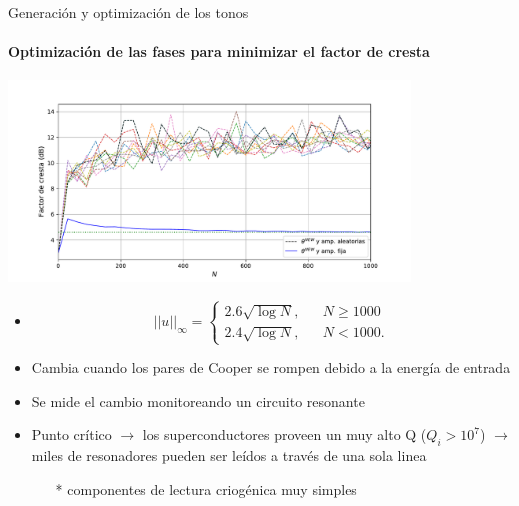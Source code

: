 \documentclass[ignorenonframetext,12pt]{beamer}
\begin{document}
\begin{frame}{Generación y optimización de los tonos}
	\framesubtitle{Optimización de las fases para minimizar el factor de cresta}
	\centering
	\qquad \includegraphics[width=0.8\textwidth]{c3_fc_newman_amp_fases_aleatorias_tot}
	\begin{itemize}
		\item 
			\begin{equation}\label{eq_fc_aleatorios}
  ||u||_\infty = \left\{\begin{array}{rcl}
    2.6 \sqrt{\log{N}}, && N \geq 1000\\
    2.4 \sqrt{\log{N}}, && N < 1000.
  \end{array}\right.
\end{equation}

		\item Cambia cuando los pares de Cooper se rompen debido a la
			energía de entrada
		\item Se mide el cambio monitoreando un circuito resonante
		\item Punto crítico $\to$ los \alert{superconductores proveen un muy
			alto Q} ($Q_i > 10^7$) $\to$ miles de resonadores
			pueden ser leídos a través de una sola linea 
			\begin{itemize}
				\item[*] \scriptsize{{\color{blue}componentes de lectura criogénica muy
					simples}}
			\end{itemize}
	\end{itemize}
\end{frame}
\end{document}

